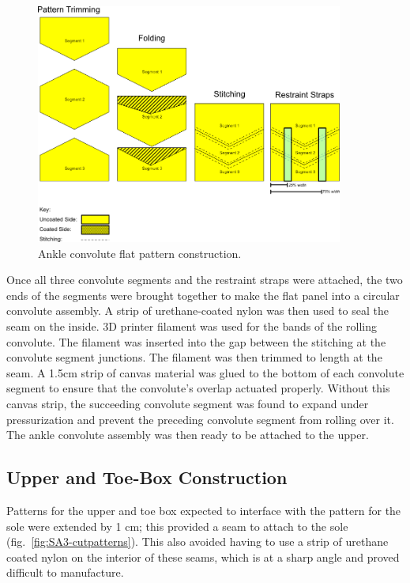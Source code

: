 \documentclass[defaultstyle,11pt]{thesis}
\begin{document}
\begin{figure}
\hypertarget{fig:SA3-convoluteflat}{%
\centering
\includegraphics[width=0.9\textwidth,height=\textheight]{../fig/SA3/ConvoluteConstruction.png}
\caption{Ankle convolute flat pattern construction.}\label{fig:SA3-convoluteflat}
}
\end{figure}

Once all three convolute segments and the restraint straps were attached, the two ends of the segments were brought together to make the flat panel into a circular convolute assembly.
A strip of urethane-coated nylon was then used to seal the seam on the inside.
3D printer filament was used for the bands of the rolling convolute.
The filament was inserted into the gap between the stitching at the convolute segment junctions.
The filament was then trimmed to length at the seam.
A 1.5cm strip of canvas material was glued to the bottom of each convolute segment to ensure that the convolute's overlap actuated properly.
Without this canvas strip, the succeeding convolute segment was found to expand under pressurization and prevent the preceding convolute segment from rolling over it.
The ankle convolute assembly was then ready to be attached to the upper.

\hypertarget{upper-and-toe-box-construction}{%
\subsection{Upper and Toe-Box Construction}\label{upper-and-toe-box-construction}}

Patterns for the upper and toe box expected to interface with the pattern for the sole were extended by 1 cm; this provided a seam to attach to the sole (fig.~\ref{fig:SA3-cutpatterns}).
This also avoided having to use a strip of urethane coated nylon on the interior of these seams, which is at a sharp angle and proved difficult to manufacture.
\end{document}
